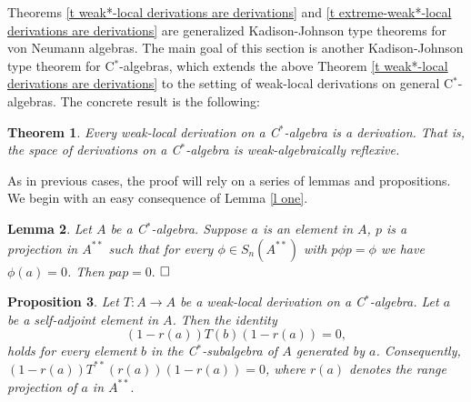 \documentclass[11pt]{amsart}
\newtheorem{theorem}{Theorem}[section]
\newtheorem{lemma}[theorem]{Lemma}
\newtheorem{proposition}[theorem]{Proposition}
\begin{document}
Theorems \ref{t weak*-local derivations are derivations} and \ref{t extreme-weak*-local derivations are derivations} are generalized Kadison-Johnson type theorems for von Neumann algebras. The main goal of this section is another Kadison-Johnson type theorem for C$^*$-algebras, which extends the above Theorem  \ref{t weak*-local derivations are derivations} to the setting of weak-local derivations on general C$^*$-algebras. The concrete result is the following:

\begin{theorem}\label{t weak-local derivations are derivations} Every weak-local derivation on a C$^*$-algebra is a derivation.  That is, the space of derivations on a C$^*$-algebra is weak-algebraically reflexive.
\end{theorem}

As in previous cases, the proof will rely on a series of lemmas and propositions. We begin with an easy consequence of Lemma \ref{l one}.

\begin{lemma}\label{l one C*-algebras} Let $A$ be a C$^*$-algebra. Suppose $a$ is an element in $A$, $p$ is a projection in $A^{**}$ such that for every $\phi \in S_n (A^{**})$ with $p\phi p = \phi$ we have $\phi (a) =0$. Then $p a p =0.$ $\hfill\Box$
\end{lemma}

\begin{proposition}\label{p range projections in weak-local projections} Let $T: A\to A$ be a weak-local derivation on a C$^*$-algebra. Let $a$ be a self-adjoint element in $A$. Then the identity $$(1-r(a)) T (b) (1-r(a)) =0,$$ holds for every element $b$ in the C$^*$-subalgebra of $A$ generated by $a$. Consequently, $(1-r(a)) T^{**} (r(a)) (1-r(a)) =0$, where $r(a)$ denotes the range projection of $a$ in $A^{**}.$
\end{proposition}
\end{document}
